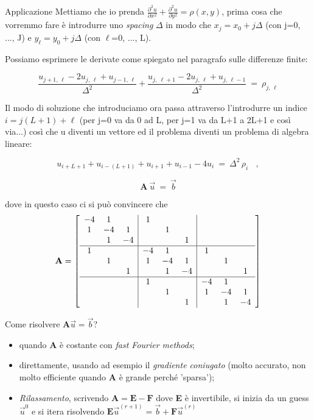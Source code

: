 \begin{dimostrazione}{Applicazione}
	Mettiamo che io prenda $\displaystyle\frac{\partial^2 u}{\partial x^2} +  \frac{\partial^2 u}{\partial y^2} = \rho(x, y)$, prima cosa che vorremmo fare è introdurre uno \emph{spacing} $\Delta$ in modo che ${x_j}=x_0+j\Delta$ (con j=0, ..., J) e ${y_\ell}=y_0+j\Delta$ (con $\ell$=0, ..., L).
	
	Possiamo esprimere le derivate come spiegato nel paragrafo sulle differenze finite:
	
	\[\frac{u_{j+1,\, \ell}-2u_{j,\, \ell} + u_{j-1,\, \ell}}{\Delta^2} + \frac{u_{j,\ \ell+1}-2u_{j,\, \ell} + u_{j,\, \ell-1}}{\Delta^2}\ =\ \rho_{j,\,\ell}\]
	
	Il modo di soluzione che introduciamo ora passa attraverso l'introdurre un indice $i=j(L+1)+\ell$ (per j=0 va da 0 ad L, per j=1 va da L+1 a 2L+1 e così via...) così che u diventi un vettore ed il problema diventi un problema di algebra lineare:
	
	\[ u_{i+L+1}+u_{i-(L+1)} + u_{i+1} + u_{i-1} - 4u_i \ =\ \Delta^2\, \rho_i\ \ \ \ ,\]
	
	\[ \textbf{A}\ \vec u\ = \ \vec b \]
	
	dove in questo caso ci si può convincere che 
	\[\textbf{A}=\left[
	\begin{array}{ccc|ccc|ccc}
		-4 & 1 &  & 1 & &  &  &  &  \\
		1 & -4 & 1 &  & 1 &  &  &  & \\
		& 1 & -4 &  &  & 1 &  &  &  \\
		\hline
		1 &  &  & -4 & 1 &  & 1 &  &  \\
		& 1 &  & 1 & -4 & 1 &  & 1 &  \\
		&  & 1 &  & 1 & -4 &  &  & 1 \\
		\hline
		&  & & 1 &  &  & -4 & 1 &  \\
		&  & & & 1 &  & 1 & -4 & 1 \\
		& & & & & 1 & & 1 & -4 \\
	\end{array}
	\right]
	\]
	
	
	Come risolvere $\textbf{A}\vec u = \vec b$? 
	\begin{itemize}
		\item quando \textbf{A} è costante con \emph{fast Fourier methods};
		\item direttamente, usando ad esempio il \emph{gradiente coniugato} (molto accurato, non molto efficiente quando \textbf{A} è grande perché 'sparsa');
		\item \emph{Rilassamento}, scrivendo $\textbf{A}=\textbf{E}-\textbf{F}$ dove \textbf{E} è invertibile, si inizia da un guess $\vec u^{0}$ e si itera risolvendo $\textbf{E} \vec{u}^{(r+1)}=\vec b + \textbf{F} \vec u^{(r)}$
	\end{itemize}
\end{dimostrazione}


